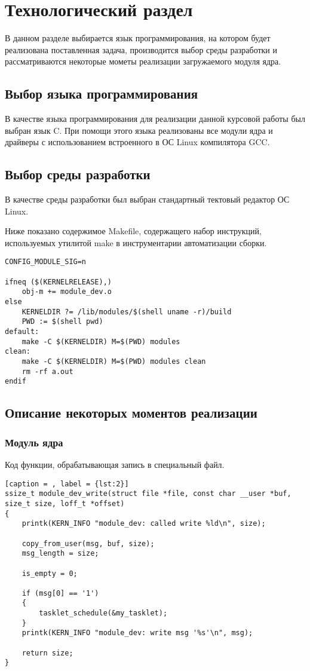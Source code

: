 \section{Технологический раздел}
В данном разделе выбирается язык программирования, на котором будет реализована поставленная задача, производится выбор среды разработки и рассматриваются некоторые мометы реализации загружаемого модуля ядра.
\subsection{Выбор языка программирования}
В качестве языка программирования для реализации данной курсовой работы был выбран язык C. При помощи этого языка реализованы все модули ядра и драйверы с использованием встроенного в ОС Linux компилятора GCC.
\subsection{Выбор среды разработки}
В качестве среды разработки был выбран стандартный тектовый редактор ОС Linux.

Ниже показано содержимое Makefile, содержащего набор инструкций, используемых утилитой make в инструментарии автоматизации сборки.

\begin{lstlisting}[caption = Содержимое Makefile, label = {lst:1}]
CONFIG_MODULE_SIG=n

ifneq ($(KERNELRELEASE),)
	obj-m += module_dev.o
else
	KERNELDIR ?= /lib/modules/$(shell uname -r)/build
	PWD := $(shell pwd)
default:
	make -C $(KERNELDIR) M=$(PWD) modules
clean:
	make -C $(KERNELDIR) M=$(PWD) modules clean
	rm -rf a.out
endif
\end{lstlisting}

\subsection{Описание некоторых моментов реализации}
\subsubsection{Модуль ядра}
Код функции, обрабатывающая запись в специальный файл.
\begin{lstlisting}[caption = , label = {lst:2}]
ssize_t module_dev_write(struct file *file, const char __user *buf, size_t size, loff_t *offset)
{
    printk(KERN_INFO "module_dev: called write %ld\n", size);

    copy_from_user(msg, buf, size);
    msg_length = size;

    is_empty = 0;

    if (msg[0] == '1')
    {
        tasklet_schedule(&my_tasklet);
    }
    printk(KERN_INFO "module_dev: write msg '%s'\n", msg);

    return size;
}
\end{lstlisting}

